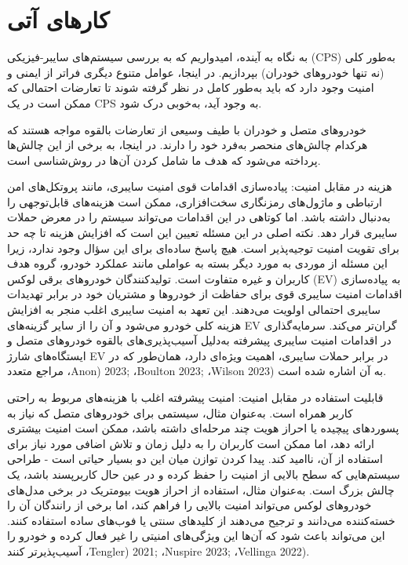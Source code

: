 \documentclass[a4paper,10pt]{article}
\begin{document}
    \section{کارهای آتی}

        به نگاه به آینده، امیدواریم که به بررسی سیستم‌های سایبر-فیزیکی (CPS) به‌طور کلی (نه تنها خودروهای خودران) بپردازیم. در اینجا، عوامل متنوع دیگری فراتر از ایمنی و امنیت وجود دارد که باید به‌طور کامل در نظر گرفته شوند تا تعارضات احتمالی که ممکن است در یک CPS به وجود آید، به‌خوبی درک شود.

        خودروهای متصل و خودران با طیف وسیعی از تعارضات بالقوه مواجه هستند که هرکدام چالش‌های منحصر به‌فرد خود را دارند. در اینجا، به برخی از این چالش‌ها پرداخته می‌شود که هدف ما شامل کردن آن‌ها در روش‌شناسی است.

        هزینه در مقابل امنیت: پیاده‌سازی اقدامات قوی امنیت سایبری، مانند پروتکل‌های امن ارتباطی و ماژول‌های رمزنگاری سخت‌افزاری، ممکن است هزینه‌های قابل‌توجهی را به‌دنبال داشته باشد. اما کوتاهی در این اقدامات می‌تواند سیستم را در معرض حملات سایبری قرار دهد. نکته اصلی در این مسئله تعیین این است که افزایش هزینه تا چه حد برای تقویت امنیت توجیه‌پذیر است. هیچ پاسخ ساده‌ای برای این سؤال وجود ندارد، زیرا این مسئله از موردی به مورد دیگر بسته به عواملی مانند عملکرد خودرو، گروه هدف کاربران و غیره متفاوت است. تولیدکنندگان خودروهای برقی لوکس (EV) به پیاده‌سازی اقدامات امنیت سایبری قوی برای حفاظت از خودروها و مشتریان خود در برابر تهدیدات سایبری احتمالی اولویت می‌دهند. این تعهد به امنیت سایبری اغلب منجر به افزایش هزینه کلی خودرو می‌شود و آن را از سایر گزینه‌های EV گران‌تر می‌کند. سرمایه‌گذاری در اقدامات امنیت سایبری پیشرفته به‌دلیل آسیب‌پذیری‌های بالقوه خودروهای متصل و ایستگاه‌های شارژ EV در برابر حملات سایبری، اهمیت ویژه‌ای دارد، همان‌طور که در مراجع متعدد ،Anon) 2023; ،Boulton 2023; ،Wilson 2023) به آن اشاره شده است.

        قابلیت استفاده در مقابل امنیت: امنیت پیشرفته اغلب با هزینه‌های مربوط به راحتی کاربر همراه است. به‌عنوان مثال، سیستمی برای خودروهای متصل که نیاز به پسوردهای پیچیده یا احراز هویت چند مرحله‌ای داشته باشد، ممکن است امنیت بیشتری ارائه دهد، اما ممکن است کاربران را به دلیل زمان و تلاش اضافی مورد نیاز برای استفاده از آن، ناامید کند. پیدا کردن توازن میان این دو بسیار حیاتی است - طراحی سیستم‌هایی که سطح بالایی از امنیت را حفظ کرده و در عین حال کاربرپسند باشد، یک چالش بزرگ است. به‌عنوان مثال، استفاده از احراز هویت بیومتریک در برخی مدل‌های خودروهای لوکس می‌تواند امنیت بالایی را فراهم کند، اما برخی از رانندگان آن را خسته‌کننده می‌دانند و ترجیح می‌دهند از کلیدهای سنتی یا فوب‌های ساده استفاده کنند. این می‌تواند باعث شود که آن‌ها این ویژگی‌های امنیتی را غیر فعال کرده و خودرو را آسیب‌پذیرتر کنند ،Tengler) 2021; ،Nuspire 2023; ،Vellinga 2022).
\end{document}
